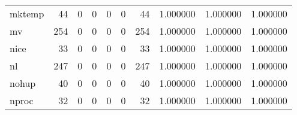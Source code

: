 \begin{tabular}{lrrrrrrrrr}
mktemp    &                                        44 &                                                  0 &                                                  0 &                                                  0 &                                                  0 &                                                 44 &                                           1.000000 &                               1.000000 &                             1.000000 \\
mv        &                                       254 &                                                  0 &                                                  0 &                                                  0 &                                                  0 &                                                254 &                                           1.000000 &                               1.000000 &                             1.000000 \\
nice      &                                        33 &                                                  0 &                                                  0 &                                                  0 &                                                  0 &                                                 33 &                                           1.000000 &                               1.000000 &                             1.000000 \\
nl        &                                       247 &                                                  0 &                                                  0 &                                                  0 &                                                  0 &                                                247 &                                           1.000000 &                               1.000000 &                             1.000000 \\
nohup     &                                        40 &                                                  0 &                                                  0 &                                                  0 &                                                  0 &                                                 40 &                                           1.000000 &                               1.000000 &                             1.000000 \\
nproc     &                                        32 &                                                  0 &                                                  0 &                                                  0 &                                                  0 &                                                 32 &                                           1.000000 &                               1.000000 &                             1.000000 \\

\end{tabular}
